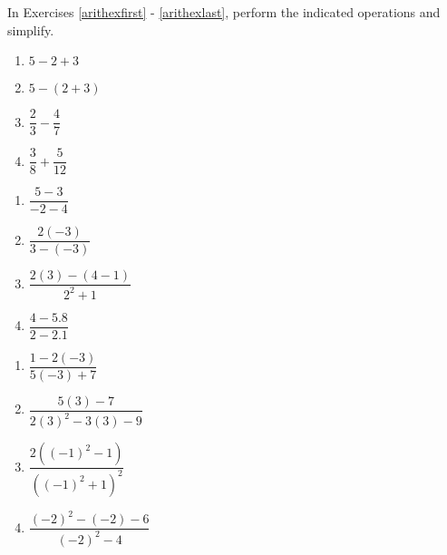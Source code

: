 \label{ExercisesforAppRealNumberArithmetic}

In Exercises \ref{arithexfirst} - \ref{arithexlast}, perform the indicated operations and simplify.

\begin{multicols}{4}
\begin{enumerate}

\item $5 - 2 + 3$ \label{arithexfirst}
\item $5 - (2+3)$
\item  $\dfrac{2}{3} - \dfrac{4}{7}$
\item  $\dfrac{3}{8} + \dfrac{5}{12}$

\setcounter{HW}{\value{enumi}}
\end{enumerate}
\end{multicols}

\begin{multicols}{4}
\begin{enumerate}
\setcounter{enumi}{\value{HW}}

\item  $\dfrac{5-3}{-2-4}$
\item  $\dfrac{2(-3)}{3 - (-3)}$
\item  $\dfrac{2(3)-(4-1)}{2^2 + 1}$
\item  $\dfrac{4 - 5.8}{2 - 2.1}$

\setcounter{HW}{\value{enumi}}
\end{enumerate}
\end{multicols}

\begin{multicols}{4}
\begin{enumerate}
\setcounter{enumi}{\value{HW}}

\item  $\dfrac{1 - 2(-3)}{5(-3) + 7}$
\item  $\dfrac{5(3) - 7}{2(3)^2-3(3)-9}$
\item  $\dfrac{2((-1)^2-1)}{((-1)^2+1)^2}$
\item  $\dfrac{(-2)^2 - (-2) - 6}{(-2)^2 - 4}$


\setcounter{HW}{\value{enumi}}
\end{enumerate}
\end{multicols}



